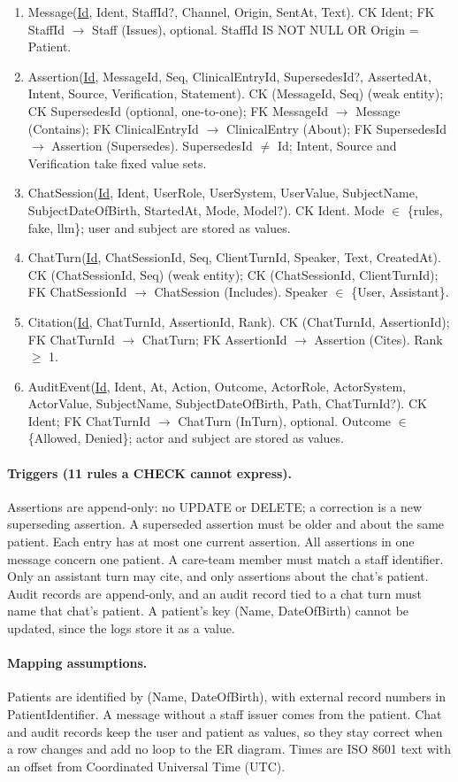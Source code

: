 \documentclass[sigconf]{acmart}
\begin{document}
\begin{enumerate}
\item Message(\underline{Id}, Ident, StaffId?, Channel, Origin, SentAt, Text). CK Ident; FK StaffId $\to$ Staff (Issues), optional. StaffId IS NOT NULL OR Origin = Patient.
\item Assertion(\underline{Id}, MessageId, Seq, ClinicalEntryId, SupersedesId?, AssertedAt, Intent, Source, Verification, Statement). CK (MessageId, Seq) (weak entity); CK SupersedesId (optional, one-to-one); FK MessageId $\to$ Message (Contains); FK ClinicalEntryId $\to$ ClinicalEntry (About); FK SupersedesId $\to$ Assertion (Supersedes). SupersedesId $\ne$ Id; Intent, Source and Verification take fixed value sets.
\item ChatSession(\underline{Id}, Ident, UserRole, UserSystem, UserValue, SubjectName, SubjectDateOfBirth, StartedAt, Mode, Model?). CK Ident. Mode $\in$ \{rules, fake, llm\}; user and subject are stored as values.
\item ChatTurn(\underline{Id}, ChatSessionId, Seq, ClientTurnId, Speaker, Text, CreatedAt). CK (ChatSessionId, Seq) (weak entity); CK (ChatSessionId, ClientTurnId); FK ChatSessionId $\to$ ChatSession (Includes). Speaker $\in$ \{User, Assistant\}.
\item Citation(\underline{Id}, ChatTurnId, AssertionId, Rank). CK (ChatTurnId, AssertionId); FK ChatTurnId $\to$ ChatTurn; FK AssertionId $\to$ Assertion (Cites). Rank $\ge$ 1.
\item AuditEvent(\underline{Id}, Ident, At, Action, Outcome, ActorRole, ActorSystem, ActorValue, SubjectName, SubjectDateOfBirth, Path, ChatTurnId?). CK Ident; FK ChatTurnId $\to$ ChatTurn (InTurn), optional. Outcome $\in$ \{Allowed, Denied\}; actor and subject are stored as values.
\end{enumerate}
\paragraph{Triggers (11 rules a CHECK cannot express).} Assertions are append-only: no UPDATE or DELETE; a correction is a new superseding assertion. A superseded assertion must be older and about the same patient. Each entry has at most one current assertion. All assertions in one message concern one patient. A care-team member must match a staff identifier. Only an assistant turn may cite, and only assertions about the chat's patient. Audit records are append-only, and an audit record tied to a chat turn must name that chat's patient. A patient's key (Name, DateOfBirth) cannot be updated, since the logs store it as a value.
\paragraph{Mapping assumptions.} Patients are identified by (Name, DateOfBirth), with external record numbers in PatientIdentifier. A message without a staff issuer comes from the patient. Chat and audit records keep the user and patient as values, so they stay correct when a row changes and add no loop to the ER diagram. Times are ISO 8601 text with an offset from Coordinated Universal Time (UTC).
\end{document}
